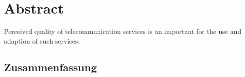 \begingroup
\let\clearpage\relax
\let\cleardoublepage\relax
\let\cleardoublepage\relax

\chapter*{Abstract}
\begin{center}

Perceived quality of telecommunication services is an important for the use and adaption of such services.



\end{center}

\vfill

\begin{otherlanguage}{ngerman}
\chapter*{Zusammenfassung}
\end{otherlanguage}

\endgroup			

\vfill